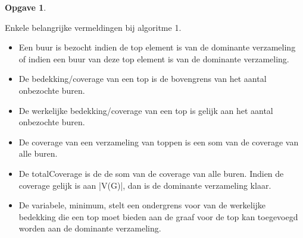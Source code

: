 \documentclass[11pt, a4paper, table]{article}
\makeatletter
\newenvironment{algoritme}[1][H]{%
	\renewcommand{\ALG@name}{Algoritme}%
	\renewcommand{\algorithmicrequire}{\textbf{Input:}}
	\renewcommand{\algorithmicensure}{\textbf{Output:}}
	\begin{algorithm}[#1]%
	}{\end{algorithm}}
\theoremstyle{definition}
\newtheorem{opgave}{Opgave}
\theoremstyle{definition}
\theoremstyle{definition}
\makeatother
\begin{document}
\begin{opgave}
\begin{tcolorbox}[blanker,float=tbp, grow to left by=2cm,grow to right by=2cm]
\begin{algoritme}
\begin{algorithmic}[1]
			\end{algorithmic}
		\end{algoritme}
		\end{tcolorbox}

		Enkele belangrijke vermeldingen bij algoritme 1. 
		\begin{itemize}
		\item Een buur is bezocht indien de top element is van de dominante verzameling of indien een buur van deze top element is van de dominante verzameling.
		\item De bedekking/coverage van een top is de bovengrens van het aantal onbezochte buren.
		\item De werkelijke bedekking/coverage van een top is gelijk aan het aantal onbezochte buren. 
		\item De coverage van een verzameling van toppen is een som van de coverage van alle buren.
		\item De totalCoverage is de de som van de coverage van alle buren. Indien de coverage gelijk is aan |V(G)|, dan is de dominante verzameling klaar. 
		\item De variabele, minimum, stelt een ondergrens voor van de werkelijke bedekking die een top moet bieden aan de graaf voor de top kan toegevoegd worden aan de dominante verzameling.
		\end{itemize}
		

\end{opgave}
\end{document}
